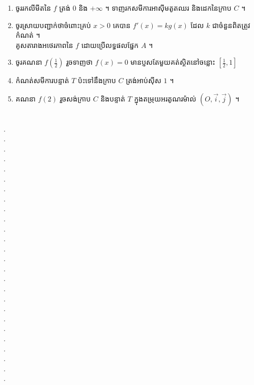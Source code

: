 \documentclass{officialexam}
\begin{document}
\begin{enumerate}[I]
\begin{enumerate}[k]
			\item ចូររកលីមីតនៃ $f$ ត្រង់ $0$ និង $+\infty$ ។ ទាញរកសមីការអាស៊ីមតូតឈរ និងដេកនៃក្រាប $C$ ។
			\item ចូរស្រាយបញ្ជាក់ថាចំពោះគ្រប់ $x>0$ គេបាន $f'(x)=kg(x)$ ដែល $k$ ជាចំនួនពិតត្រូវកំណត់ ។​\\ គូសតារាងអថេរភាពនៃ $f$ ដោយប្រើលទ្ធផលផ្នែក $A$ ។
			\item ចូរគណនា $f\left(\frac{1}{2}\right)$ រួចទាញថា $f(x)=0$ មានប្ញសតែមួយគត់ស្ថិតនៅចន្លោះ $\left[\frac{1}{2},1\right]$
			\item កំណត់សមីការបន្ទាត់ $T$ ប៉ះទៅនឹងក្រាប $C$ ត្រង់អាប់ស៊ីស $1$ ។
			\item គណនា $f(2)$ រួចសង់ក្រាប $C$ និងបន្ទាត់ $T$ ក្នុងតម្រុយអរតូណរម៉ាល់ $(O,\vec{i}, \vec{j})$ ។
		\end{enumerate}
	\end{enumerate}
\borderline{\bigg[ចម្លើយ\bigg]}\\
{\color{white}.}\dotfill\\
{\color{white}.}\dotfill\\
{\color{white}.}\dotfill
\\
{\color{white}.}\dotfill\\
{\color{white}.}\dotfill\\
{\color{white}.}\dotfill
\\
{\color{white}.}\dotfill\\
{\color{white}.}\dotfill\\
{\color{white}.}\dotfill
\\
{\color{white}.}\dotfill\\
{\color{white}.}\dotfill\\
{\color{white}.}\dotfill
\\
{\color{white}.}\dotfill\\
{\color{white}.}\dotfill\\
{\color{white}.}\dotfill
\\
{\color{white}.}\dotfill\\
{\color{white}.}\dotfill\\
{\color{white}.}\dotfill
\\
{\color{white}.}\dotfill\\
{\color{white}.}\dotfill\\
{\color{white}.}\dotfill
\\
{\color{white}.}\dotfill\\
{\color{white}.}\dotfill\\
{\color{white}.}\dotfill
\\
{\color{white}.}\dotfill\\
{\color{white}.}\dotfill
\end{document}
